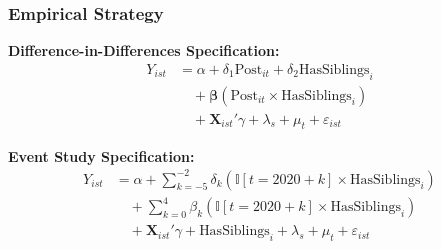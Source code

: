 \documentclass{beamer}
\begin{document}
\begin{frame}
    \label{frame:empirical}
    \frametitle{Empirical Strategy}

    
    \textbf{Difference-in-Differences Specification:}
    \small
    \begin{align}
    Y_{ist} &= \alpha + \delta_1 \text{Post}_{it} + \delta_2 \text{HasSiblings}_{i} \nonumber  \\
    &\quad + \boldsymbol{\beta} (\text{Post}_{it} \times \text{HasSiblings}_{i}) \nonumber \\
    &\quad + \mathbf{X}_{ist}'\gamma + \lambda_s + \mu_t + \varepsilon_{ist}
    \end{align}
    
    \vspace{0.1cm}
    
    \textbf{Event Study Specification:}
    \begin{align}
    Y_{ist} &= \alpha + \sum_{k=-5}^{-2} \delta_k (\mathbb{I}[t = 2020+k] \times \text{HasSiblings}_{i}) \nonumber \\
    & \quad + \sum_{k=0}^{4} \beta_k (\mathbb{I}[t = 2020 + k] \times \text{HasSiblings}_{i}) \nonumber \\
    & \quad + \mathbf{X}_{ist}'\gamma + \text{HasSiblings}_{i} + \lambda_s + \mu_t + \varepsilon_{ist}
    \end{align}
    \normalsize
    
    
\end{frame}





    




\end{document}

